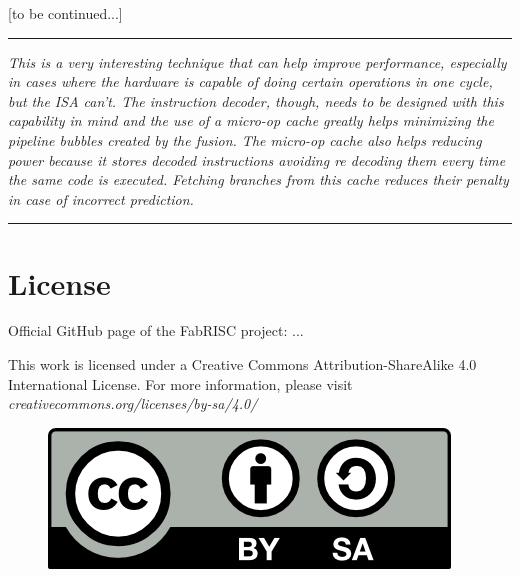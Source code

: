 \documentclass{article}
\begin{document}
        [to be continued...]

        \par\noindent\rule{\textwidth}{0.4pt}
        \textit{This is a very interesting technique that can help improve performance, especially in cases where the hardware is capable of doing certain operations in one cycle, but the ISA can't. The instruction decoder, though, needs to be designed with this capability in mind and the use of a micro-op cache greatly helps minimizing the pipeline bubbles created by the fusion. The micro-op cache also helps reducing power because it stores decoded instructions avoiding re decoding them every time the same code is executed. Fetching branches from this cache reduces their penalty in case of incorrect prediction.}
        \par\noindent\rule{\textwidth}{0.4pt}

    \clearpage


    \section[License]{License}

        \vspace{10pt}

        Official GitHub page of the FabRISC project: ...

        \vspace{10pt}

        This work is licensed under a Creative Commons Attribution-ShareAlike 4.0 International License. For more information, please visit \textit{creativecommons.org/licenses/by-sa/4.0/}

        \begin{figure}[hbt!]

            \includegraphics[scale = 0.8]{./Images/LICENSE.png}
            \label{fig:LICENSE}
        
        \end{figure}

    \clearpage
\end{document}
